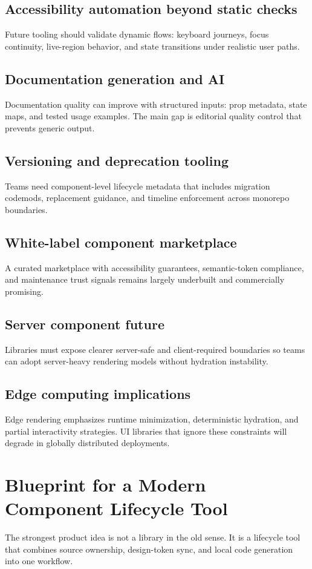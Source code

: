 \documentclass[11pt,twoside,a4paper]{article}
\begin{document}
\subsection{Accessibility automation beyond static checks}
Future tooling should validate dynamic flows: keyboard journeys, focus continuity, live-region behavior, and state transitions under realistic user paths.

\subsection{Documentation generation and AI}
Documentation quality can improve with structured inputs: prop metadata, state maps, and tested usage examples. The main gap is editorial quality control that prevents generic output.

\subsection{Versioning and deprecation tooling}
Teams need component-level lifecycle metadata that includes migration codemods, replacement guidance, and timeline enforcement across monorepo boundaries.

\subsection{White-label component marketplace}
A curated marketplace with accessibility guarantees, semantic-token compliance, and maintenance trust signals remains largely underbuilt and commercially promising.

\subsection{Server component future}
Libraries must expose clearer server-safe and client-required boundaries so teams can adopt server-heavy rendering models without hydration instability.

\subsection{Edge computing implications}
Edge rendering emphasizes runtime minimization, deterministic hydration, and partial interactivity strategies. UI libraries that ignore these constraints will degrade in globally distributed deployments.

\section{Blueprint for a Modern Component Lifecycle Tool}
The strongest product idea is not a library in the old sense. It is a lifecycle tool that combines source ownership, design-token sync, and local code generation into one workflow.
\end{document}
